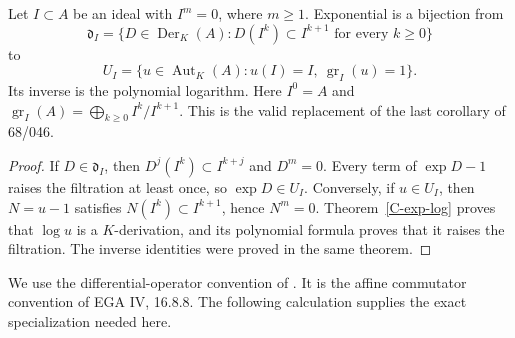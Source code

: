 \begin{theorem}\label{C-filtered}
Let $I\subset A$ be an ideal with $I^m=0$, where $m\geq1$. Exponential is a
bijection from
\[
 \mathfrak d_I=
 \{D\in\operatorname{Der}_K(A):D(I^k)\subset I^{k+1}
                         \text{ for every }k\geq0\}
\]
to
\[
 U_I=\{u\in\operatorname{Aut}_K(A):u(I)=I,
                 \ \operatorname{gr}_I(u)=1\}.
\]
Its inverse is the polynomial logarithm. Here $I^0=A$ and
$\operatorname{gr}_I(A)=\bigoplus_{k\geq0}I^k/I^{k+1}$.
This is the valid replacement of the last corollary of 68/046.
\end{theorem}
\begin{proof}
If $D\in\mathfrak d_I$, then $D^j(I^k)\subset I^{k+j}$ and $D^m=0$.
Every term of $\exp D-1$ raises the filtration at least once, so
$\exp D\in U_I$. Conversely, if $u\in U_I$, then
$N=u-1$ satisfies $N(I^k)\subset I^{k+1}$, hence $N^m=0$.
Theorem~\ref{C-exp-log} proves that $\log u$ is a $K$-derivation, and
its polynomial formula proves that it raises the filtration. The inverse
identities were proved in the same theorem.
\end{proof}

We use the differential-operator convention of
\cite[Definition 10.133.1 and Lemma 10.133.2, tags 09CI and 09CJ]{StacksDiff}.
It is the affine commutator convention of EGA IV, 16.8.8.
The following calculation supplies the exact specialization needed here.

